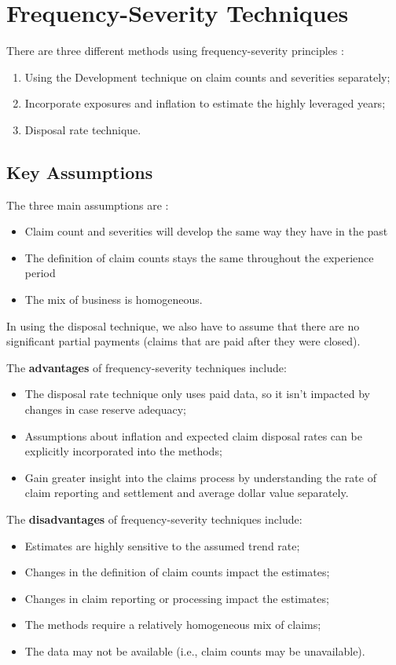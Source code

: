 \documentclass[11pt, english]{memoir}
\numberwithin{definition}{section}
\begin{document}
\chapter{Frequency-Severity Techniques}

There are three different methods using frequency-severity principles : 
\begin{enumerate}
	\item Using the Development technique on claim counts and severities separately;
	\item Incorporate exposures and inflation to estimate the highly leveraged years;
	\item Disposal rate technique.
\end{enumerate}

\section{Key Assumptions}
The three main assumptions are : 
\begin{itemize}
	\item Claim count and severities will develop the same way they have in the past
	\item The definition of claim counts stays the same throughout the experience period
	\item The mix of business is homogeneous.
\end{itemize}

In using the disposal technique, we also have to assume that there are no significant partial payments (claims that are paid after they were closed).

The \textbf{advantages} of frequency-severity techniques include:
\begin{itemize}
	\item The disposal rate technique only uses paid data, so it isn’t impacted by changes in case reserve adequacy;
	\item Assumptions about inflation and expected claim disposal rates can be explicitly incorporated into the methods;
	\item Gain greater insight into the claims process by understanding the rate of claim reporting and settlement and average dollar value separately.
\end{itemize}


The \textbf{disadvantages} of frequency-severity techniques include:
\begin{itemize}
	\item Estimates are highly sensitive to the assumed trend rate;
	\item Changes in the definition of claim counts impact the estimates;
	\item Changes in claim reporting or processing impact the estimates;
	\item The methods require a relatively homogeneous mix of claims;
	\item The data may not be available (i.e., claim counts may be unavailable).
\end{itemize}
\end{document}
